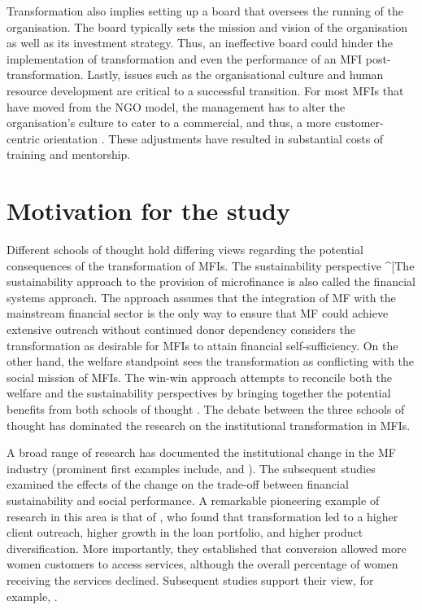 \documentclass[a4paper, nobind]{templates/ociamthesis}
\begin{document}
Transformation also implies setting up a board that oversees the running of the organisation. The board typically sets the mission and vision of the organisation as well as its investment strategy. Thus, an ineffective board could hinder the implementation of transformation \autocite{campion1999institutional} and even the performance of an MFI post-transformation. Lastly, issues such as the organisational culture and human resource development are critical to a successful transition. For most MFIs that have moved from the NGO model, the management has to alter the organisation's culture to cater to a commercial, and thus, a more customer-centric orientation \autocite{christen2001commercialization}. These adjustments have resulted in substantial costs of training and mentorship.

\hypertarget{motivation-for-the-study}{%
\section{Motivation for the study}\label{motivation-for-the-study}}

\noindent Different schools of thought hold differing views regarding the potential consequences of the transformation of MFIs. The sustainability perspective \^{}{[}The sustainability approach to the provision of microfinance is also called the financial systems approach. The approach assumes that the integration of MF with the mainstream financial sector is the only way to ensure that MF could achieve extensive outreach without continued donor dependency \autocite{rhyne1999microfinance} considers the transformation as desirable for MFIs to attain financial self-sufficiency. On the other hand, the welfare standpoint sees the transformation as conflicting with the social mission of MFIs. The win-win approach attempts to reconcile both the welfare and the sustainability perspectives by bringing together the potential benefits from both schools of thought \autocite{kodongo2013individual}. The debate between the three schools of thought has dominated the research on the institutional transformation in MFIs.

A broad range of research has documented the institutional change in the MF industry (prominent first examples include,\textcite{ledgerwood1998microfinance} and \textcite{ledgerwood2006transforming}). The subsequent studies examined the effects of the change on the trade-off between financial sustainability and social performance. A remarkable pioneering example of research in this area is that of \textcite{frank2008stemming}, who found that transformation led to a higher client outreach, higher growth in the loan portfolio, and higher product diversification. More importantly, they established that conversion allowed more women customers to access services, although the overall percentage of women receiving the services declined. Subsequent studies support their view, for example, \autocites[ ]{hartarska2012governance,bos2015practice}{d2017ngos}.
\end{document}
